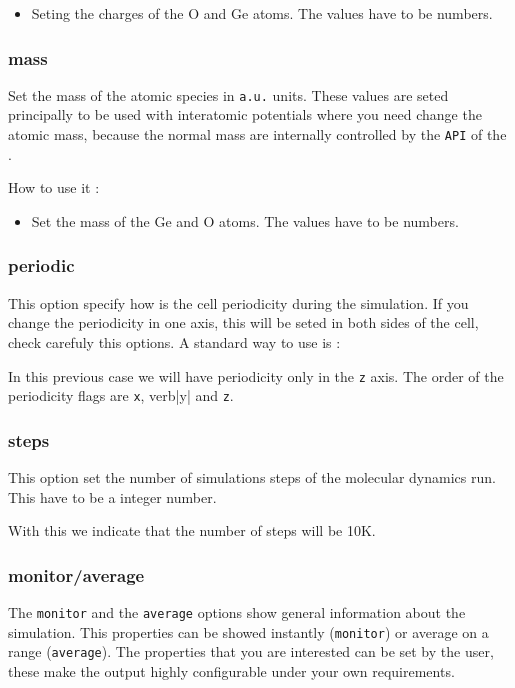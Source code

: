 \begin{itemize}
 \item Seting the charges of the O and Ge atoms. The values have to be numbers.
\end{itemize}

\subsubsection{mass}

Set the mass of the atomic species in \verb|a.u.| units. These values are seted
principally to be used with interatomic potentials where you need change the
atomic mass, because the normal mass are internally controlled by the
\verb|API| of the {\lpmd}.

How to use it :

\begin{itemize}
 \item Set the mass of the Ge and O atoms. The values have to be numbers.
\end{itemize}

\subsubsection{periodic}

This option specify how is the cell periodicity during the simulation. If you
change the periodicity in one axis, this will be seted in both sides of the
cell, check carefuly this options. A standard way to use is :


In this previous case we will have periodicity only in the \verb|z| axis. The
order of the periodicity flags are \verb|x|, verb|y| and \verb|z|.

\subsubsection{steps}
This option set the number of simulations steps of the molecular
dynamics run. This have to be a integer number.


With this we indicate that the number of steps will be 10K.

\subsubsection{monitor/average}
The \verb|monitor| and the \verb|average| options show general information
about the simulation. This properties can be showed instantly (\verb|monitor|)
or average on a range (\verb|average|). The properties that you are interested
can be set by the user, these make the output highly configurable under your
own requirements.

